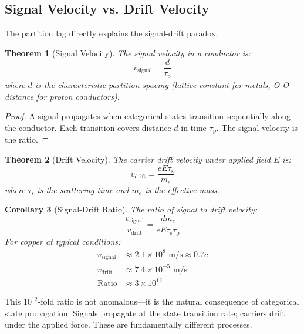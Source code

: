 \documentclass[twocolumn,10pt]{article}
\newtheorem{theorem}{Theorem}[section]
\newtheorem{corollary}[theorem]{Corollary}
\theoremstyle{definition}
\theoremstyle{remark}
\newcommand{\taup}{\tau_{\mathrm{p}}}
\newcommand{\taus}{\tau_{\mathrm{s}}}
\begin{document}
\subsection{Signal Velocity vs. Drift Velocity}

The partition lag directly explains the signal-drift paradox.

\begin{theorem}[Signal Velocity]
\label{thm:signal_velocity}
The signal velocity in a conductor is:
\begin{equation}
v_{\text{signal}} = \frac{d}{\taup}
\end{equation}
where $d$ is the characteristic partition spacing (lattice constant for metals, O-O distance for proton conductors).
\end{theorem}

\begin{proof}
A signal propagates when categorical states transition sequentially along the conductor. Each transition covers distance $d$ in time $\taup$. The signal velocity is the ratio.
\end{proof}

\begin{theorem}[Drift Velocity]
\label{thm:drift_velocity}
The carrier drift velocity under applied field $E$ is:
\begin{equation}
v_{\text{drift}} = \frac{eE\taus}{m_e}
\end{equation}
where $\taus$ is the scattering time and $m_e$ is the effective mass.
\end{theorem}

\begin{corollary}[Signal-Drift Ratio]
\label{cor:signal_drift}
The ratio of signal to drift velocity:
\begin{equation}
\frac{v_{\text{signal}}}{v_{\text{drift}}} = \frac{d m_e}{eE\taus\taup}
\end{equation}
For copper at typical conditions:
\begin{align}
v_{\text{signal}} &\approx 2.1 \times 10^8 \text{ m/s} \approx 0.7c \\
v_{\text{drift}} &\approx 7.4 \times 10^{-5} \text{ m/s} \\
\text{Ratio} &\approx 3 \times 10^{12}
\end{align}
\end{corollary}

This $10^{12}$-fold ratio is not anomalous---it is the natural consequence of categorical state propagation. Signals propagate at the state transition rate; carriers drift under the applied force. These are fundamentally different processes.
\end{document}
